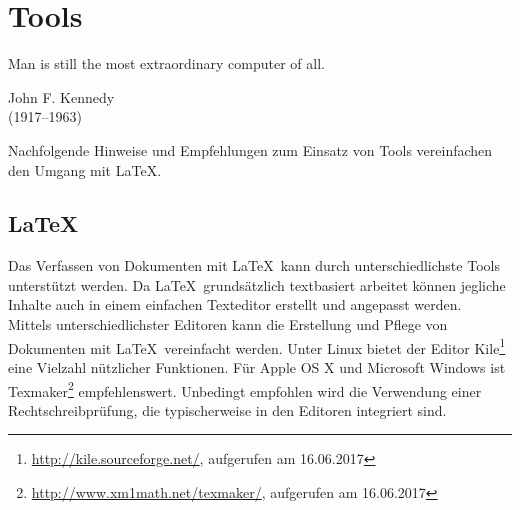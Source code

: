 \chapter{Tools}

\epigraph{\glqq Man is still the most extraordinary computer of all.\grqq\bigskip}%
{{John F. Kennedy}\\ (1917--1963)}

\noindent
Nachfolgende Hinweise und Empfehlungen zum Einsatz von Tools vereinfachen den Umgang mit \LaTeX.
\indent

\section{\LaTeX}

Das Verfassen von Dokumenten mit \LaTeX\ kann durch unterschiedlichste Tools unterstützt werden. Da \LaTeX\ grundsätzlich textbasiert
arbeitet können jegliche Inhalte auch in einem einfachen Texteditor erstellt und angepasst werden.\\

Mittels unterschiedlichster Editoren kann die Erstellung und Pflege von Dokumenten mit \LaTeX\ vereinfacht werden. Unter Linux bietet
der Editor \glqq Kile\grqq\footnote{\url{http://kile.sourceforge.net/}, aufgerufen am 16.06.2017} eine Vielzahl nützlicher Funktionen.
Für Apple OS X und Microsoft Windows ist \glqq Texmaker\grqq\footnote{\url{http://www.xm1math.net/texmaker/}, aufgerufen am 16.06.2017}
empfehlenswert. Unbedingt empfohlen wird die Verwendung einer Rechtschreibprüfung, die typischerweise in den Editoren integriert sind.